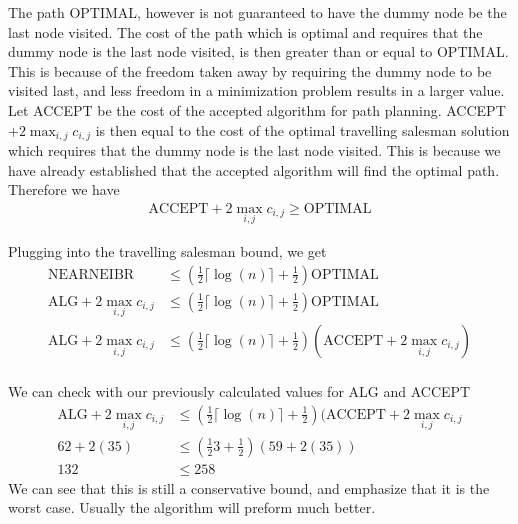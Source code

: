 The path OPTIMAL, however is not guaranteed to have the dummy node be the last node visited. The cost of the path which is optimal and requires that the dummy node is the last node visited, is then greater than or equal to OPTIMAL. This is because of the freedom taken away by requiring the dummy node to be visited last, and less freedom in a minimization problem results in a larger value. Let ACCEPT be the cost of the accepted algorithm for path planning. ACCEPT $+ 2\max_{i,j} c_{i,j}$ is then equal to the cost of the optimal travelling salesman solution which requires that the dummy node is the last node visited. This is because we have already established that the accepted algorithm will find the optimal path. Therefore we have
\begin{align*}
\text{ACCEPT} + 2\max_{i,j} c_{i,j} \geq \text{OPTIMAL}
\end{align*}

Plugging into the travelling salesman bound, we get
\begin{align*}
\text{NEARNEIBR} &\leq (\frac{1}{2} \lceil \log(n) \rceil + \frac{1}{2}) \text{OPTIMAL} \\
\text{ALG} + 2\max_{i,j} c_{i,j} &\leq (\frac{1}{2} \lceil \log(n) \rceil + \frac{1}{2}) \text{OPTIMAL} \\
\text{ALG} + 2\max_{i,j} c_{i,j} &\leq (\frac{1}{2} \lceil \log(n) \rceil + \frac{1}{2}) (\text{ACCEPT} + 2 \max_{i,j} c_{i,j}) \\ 
\end{align*} 


We can check with our previously calculated values for ALG and ACCEPT
\begin{align*}
\text{ALG} + 2\max_{i,j} c_{i,j} &\leq (\frac{1}{2} \lceil \log(n) \rceil + \frac{1}{2}) (\text{ACCEPT} + 2 \max_{i,j} c_{i,j} \\ 
62 + 2 (35) &\leq (\frac{1}{2} 3 + \frac{1}{2})(59+2(35)) \\
132 &\leq 258
\end{align*}
We can see that this is still a conservative bound, and emphasize that it is the worst case. Usually the algorithm will preform much better.



